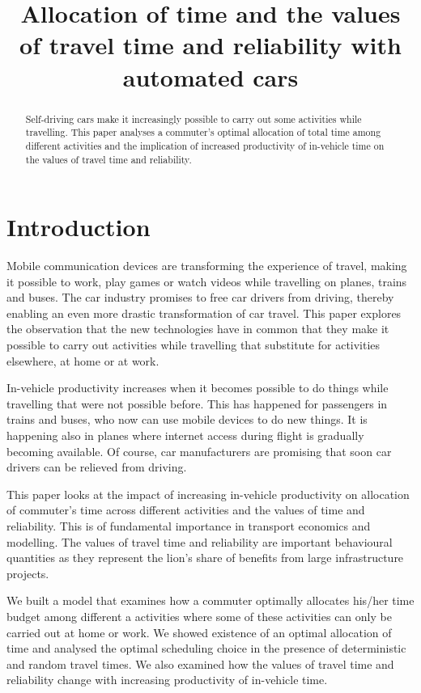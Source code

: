 \documentclass[12pt,a4paper,british]{article}
\theoremstyle{definition}
\theoremstyle{plain}
\theoremstyle{plain}
\begin{document}
\title{Allocation of time and the values of travel time and reliability with
automated cars}
\maketitle
\begin{abstract}
Self-driving cars make it increasingly possible to carry out some
activities while travelling. This paper analyses a commuter's optimal
allocation of total time among different activities and the implication
of increased productivity of in-vehicle time on the values of travel
time and reliability.
\end{abstract}

\section{Introduction}

Mobile communication devices are transforming the experience of travel,
making it possible to work, play games or watch videos while travelling
on planes, trains and buses. The car industry promises to free car
drivers from driving, thereby enabling an even more drastic transformation
of car travel. This paper explores the observation that the new technologies
have in common that they make it possible to carry out activities
while travelling that substitute for activities elsewhere, at home
or at work.

In-vehicle productivity increases when it becomes possible to do things
while travelling that were not possible before. This has happened
for passengers in trains and buses, who now can use mobile devices
to do new things. It is happening also in planes where internet access
during flight is gradually becoming available. Of course, car manufacturers
are promising that soon car drivers can be relieved from driving.

This paper looks at the impact of increasing in-vehicle productivity
on allocation of commuter's time across different activities and the
values of time and reliability. This is of fundamental importance
in transport economics and modelling. The values of travel time and
reliability are important behavioural quantities as they represent
the lion's share of benefits from large infrastructure projects. 

We built a model that examines how a commuter optimally allocates
his/her time budget among different a activities where some of these
activities can only be carried out at home or work. We showed existence
of an optimal allocation of time and analysed the optimal scheduling
choice in the presence of deterministic and random travel times. We
also examined how the values of travel time and reliability change
with increasing productivity of in-vehicle time.
\end{document}
